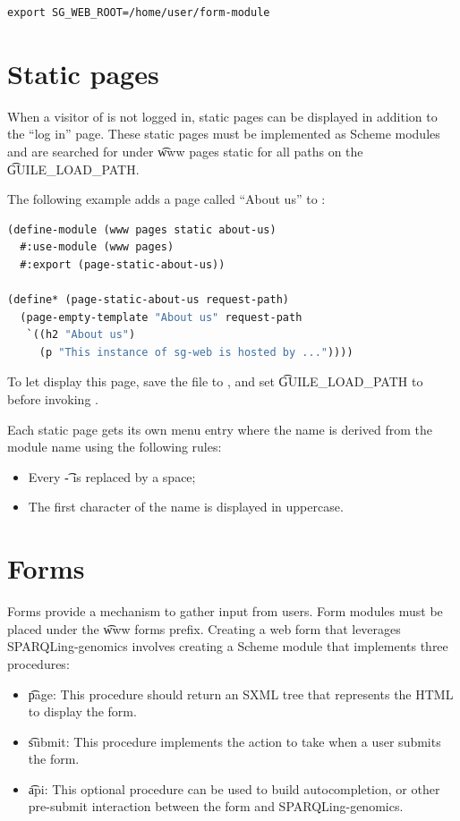 \begin{lstlisting}
export SG_WEB_ROOT=/home/user/form-module
\end{lstlisting}

\section{Static pages}
\label{sec:static-pages}

  When a visitor of  is not logged in, static pages
  can be displayed in addition to the ``log in'' page.  These static pages
  must be implemented as Scheme modules and are searched for under
  \t{www pages static} for all paths on the \t{GUILE\_LOAD\_PATH}.

  The following example adds a page called ``About us'' to :

\begin{lstlisting}[language=Lisp]
(define-module (www pages static about-us)
  #:use-module (www pages)
  #:export (page-static-about-us))

(define* (page-static-about-us request-path)
  (page-empty-template "About us" request-path
   `((h2 "About us")
     (p "This instance of sg-web is hosted by ..."))))
\end{lstlisting}

  To let  display this page, save the file to
  , and set
  \t{GUILE\_LOAD\_PATH} to  before invoking .

  Each static page gets its own menu entry where the name is derived from the
  module name using the following rules:
  \begin{itemize}
    \item{Every \t{-} is replaced by a space;}
    \item{The first character of the name is displayed in uppercase.}
  \end{itemize}

\section{Forms}
\label{sec:forms}

  Forms provide a mechanism to gather input from users.  Form modules must be
  placed under the \t{www forms} prefix.  Creating a web form that leverages
  SPARQLing-genomics involves creating a Scheme module that implements three
  procedures:
  \begin{itemize}
  \item \t{page}: This procedure should return an SXML tree that represents
    the HTML to display the form.
  \item \t{submit}: This procedure implements the action to take when a user
    submits the form.
  \item \t{api}: This optional procedure can be used to build autocompletion,
    or other pre-submit interaction between the form and SPARQLing-genomics.
  \end{itemize}


